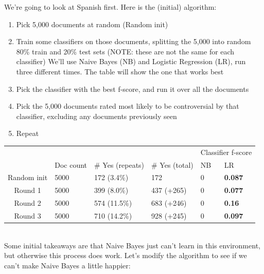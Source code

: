 \documentclass[11pt]{article} %
\begin{document}
We're going to look at Spanish first. Here is the (initial) algorithm:

\begin{enumerate}
\item Pick 5,000 documents at random (Random init)
\item Train some classifiers on those documents, splitting the 5,000 into random 80\% train and 20\% test sets (NOTE: these are not the same for each classifier)
We'll use Naive Bayes (NB) and Logistic Regression (LR), run three different times. The table will show the one that works best
\item Pick the classifier with the best f-score, and run it over all the documents
\item Pick the 5,000 documents rated most likely to be controversial by that classifier, excluding any documents previously seen
\item Repeat
\end{enumerate}

\begin{tabular}{|c|l|l|l|l|l|}
\rowcolor{gray!50} &&&& \multicolumn{2}{|c|}{Classifier f-score} \\
\rowcolor{gray!50} & Doc count & \# Yes (repeats) & \# Yes (total) & NB & LR \\
Random init & 5000 & 172 (3.4\%)& 172 & 0 & \textbf{0.087} \\
Round 1 & 5000 & 399 (8.0\%) & 437 (+265)& 0 & \textbf{0.077} \\
Round 2 & 5000 & 574 (11.5\%) & 683 (+246) & 0 & \textbf{0.16} \\
Round 3 & 5000 & 710 (14.2\%) & 928 (+245) & 0 & \textbf{0.097} \\
\end{tabular}
\\
Some initial takeaways are that Naive Bayes just can't learn in this environment, but otherwise this process does work. Let's modify the algorithm to see if we can't make Naive Bayes a little happier:
\end{document}
